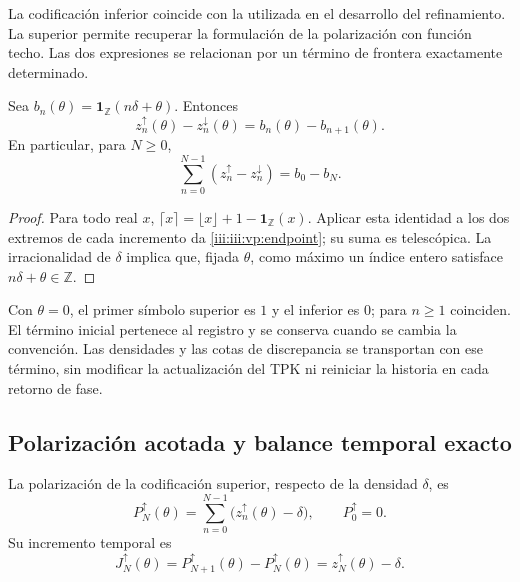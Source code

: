 La codificación inferior coincide con la utilizada en el desarrollo
del refinamiento. La superior permite recuperar la formulación de la
polarización con función techo. Las dos expresiones se relacionan por
un término de frontera exactamente determinado.

\begin{proposition}
Sea $b_n(\theta)=\mathbf1_{\mathbb Z}(n\delta+\theta)$. Entonces
\begin{equation}
 z_n^{\uparrow}(\theta)-z_n^{\downarrow}(\theta)
 =b_n(\theta)-b_{n+1}(\theta).
 \label{iii:iii:vp:endpoint}
\end{equation}
En particular, para $N\geq0$,
\[
 \sum_{n=0}^{N-1}(z_n^{\uparrow}-z_n^{\downarrow})
 =b_0-b_N.
\]
\end{proposition}
\begin{proof}
Para todo real $x$, $\lceil x\rceil=\lfloor x\rfloor+1-
\mathbf1_{\mathbb Z}(x)$. Aplicar esta identidad a los dos extremos
de cada incremento da \eqref{iii:iii:vp:endpoint}; su suma es telescópica.
La irracionalidad de $\delta$ implica que, fijada $\theta$, como máximo
un índice entero satisface $n\delta+\theta\in\mathbb Z$.
\end{proof}

Con $\theta=0$, el primer símbolo superior es $1$ y el inferior es $0$;
para $n\geq1$ coinciden. El término inicial pertenece al registro y se
conserva cuando se cambia la convención. Las densidades y las cotas de
discrepancia se transportan con ese término, sin modificar la actualización
del TPK ni reiniciar la historia en cada retorno de fase.

\subsection{Polarización acotada y balance temporal exacto}

\begin{definition}
La polarización de la codificación superior, respecto de la densidad
$\delta$, es
\begin{equation}
 P_N^{\uparrow}(\theta)
 =\sum_{n=0}^{N-1}\bigl(z_n^{\uparrow}(\theta)-\delta\bigr),
 \qquad P_0^{\uparrow}=0.
 \label{iii:iii:vp:polarization}
\end{equation}
Su incremento temporal es
\begin{equation}
 J_N^{\uparrow}(\theta)
 =P_{N+1}^{\uparrow}(\theta)-P_N^{\uparrow}(\theta)
 =z_N^{\uparrow}(\theta)-\delta.
 \label{iii:iii:vp:current}
\end{equation}
\end{definition}

